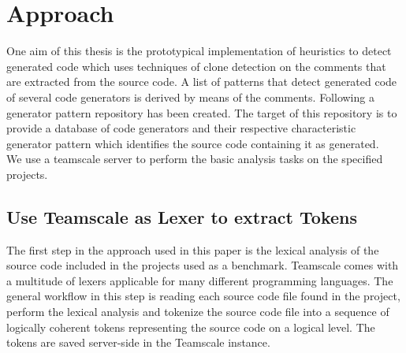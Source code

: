 
\chapter{Approach}\label{chapter:approach}
One aim of this thesis is the prototypical implementation of heuristics to detect generated code which uses techniques of clone detection on the comments that are extracted from the source code. A list of patterns that detect generated code of several code generators is derived by means of the comments. Following a generator pattern repository has been created. The target of this repository is to provide a database of code generators and their respective characteristic generator pattern which identifies the source code containing it as generated.\\
We use a teamscale server to perform the basic analysis tasks on the specified projects.
\section{Use Teamscale as Lexer to extract Tokens}
The first step in the approach used in this paper is the lexical analysis of the source code included in the projects used as a benchmark. Teamscale comes with a multitude of lexers applicable for many different programming languages. The general workflow in this step is reading each source code file found in the project, perform the lexical analysis and tokenize the source code file into a sequence of logically coherent tokens representing the source code on a logical level. The tokens are saved server-side in the Teamscale instance.


